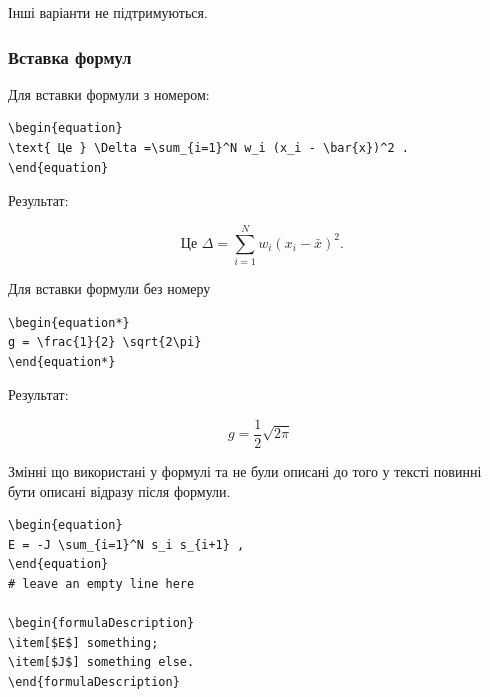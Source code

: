 Інші варіанти не підтримуються.

\subsubsection{Вставка формул}

Для вставки формули з номером:

\begin{framed}\small
\begin{lstlisting}
\begin{equation}
\text{ Це } \Delta =\sum_{i=1}^N w_i (x_i - \bar{x})^2 .
\end{equation}
\end{lstlisting}
\end{framed}

Результат:

\begin{equation}
\text{ Це } \Delta =\sum_{i=1}^N w_i (x_i - \bar{x})^2 .
\end{equation}

Для вставки формули без номеру

\begin{framed}\small
\begin{lstlisting}
\begin{equation*}
g = \frac{1}{2} \sqrt{2\pi}
\end{equation*}
\end{lstlisting}
\end{framed}

Результат:

\begin{equation*}
g = \frac{1}{2} \sqrt{2\pi}
\end{equation*}

Змінні що використані у формулі та не були описані до того у тексті повинні бути
описані відразу після формули. 

\begin{framed}\small
\begin{lstlisting}
\begin{equation}
E = -J \sum_{i=1}^N s_i s_{i+1} ,
\end{equation}
# leave an empty line here

\begin{formulaDescription}
\item[$E$] something;
\item[$J$] something else.
\end{formulaDescription}
\end{lstlisting}
\end{framed}

